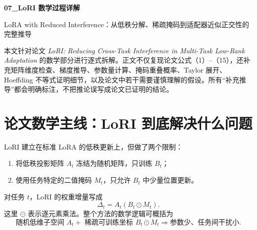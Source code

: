 \documentclass[UTF8,12pt,a4paper,fontset=none]{ctexart}
\numberwithin{equation}{section}
\begin{document}
\begin{center}
  {\LARGE\bfseries 07\_LoRI 数学过程详解}\par
  \vspace{0.35em}
  {\large LoRA with Reduced Interference：从低秩分解、稀疏掩码到适配器近似正交性的完整推导}
\end{center}
\vspace{0.5em}

\begin{keybox}[阅读说明]
本文针对论文 \emph{LoRI: Reducing Cross-Task Interference in Multi-Task Low-Rank Adaptation} 的数学部分进行逐式拆解。正文不仅复现论文公式（1）--（15），还补充矩阵维度检查、梯度推导、参数量计算、掩码重叠概率、Taylor 展开、Hoeffding 不等式证明细节，以及论文中若干需要谨慎理解的假设。所有“补充推导”都会明确标注，不把推论误写成论文已证明的结论。
\end{keybox}

\tableofcontents
\newpage

\section{论文数学主线：LoRI 到底解决什么问题}

LoRI 建立在标准 LoRA 的低秩更新上，但做了两个限制：
\begin{enumerate}[label=\arabic*.,leftmargin=2.3em]
  \item 将低秩投影矩阵 $A_t$ 冻结为随机矩阵，只训练 $B_t$；
  \item 使用任务特定的二值掩码 $M_t$，只允许 $B_t$ 中少量位置更新。
\end{enumerate}

对任务 $t$，LoRI 的权重增量写成
\begin{equation}
  \Delta_t=A_t(B_t\odot M_t).
  \label{eq:lori-core}
\end{equation}
这里 $\odot$ 表示逐元素乘法。整个方法的数学逻辑可概括为
\begin{equation}
  \boxed{
  \text{随机低维子空间 }A_t
  +\text{ 稀疏可训练坐标 }B_t\odot M_t
  \Longrightarrow
  \text{参数少、任务间干扰小}
  }.
\end{equation}
\end{document}
